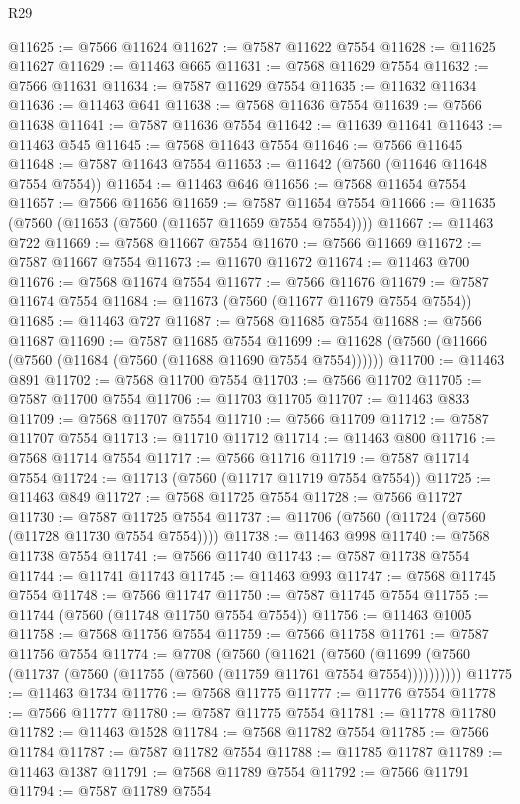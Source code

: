 \begin{lexlean}{R29}
\begin{coremodule}
@11625 := @7566 @11624
@11627 := @7587 @11622 @7554
@11628 := @11625 @11627
@11629 := @11463 @665
@11631 := @7568 @11629 @7554
@11632 := @7566 @11631
@11634 := @7587 @11629 @7554
@11635 := @11632 @11634
@11636 := @11463 @641
@11638 := @7568 @11636 @7554
@11639 := @7566 @11638
@11641 := @7587 @11636 @7554
@11642 := @11639 @11641
@11643 := @11463 @545
@11645 := @7568 @11643 @7554
@11646 := @7566 @11645
@11648 := @7587 @11643 @7554
@11653 := @11642 (@7560 (@11646 @11648 @7554 @7554))
@11654 := @11463 @646
@11656 := @7568 @11654 @7554
@11657 := @7566 @11656
@11659 := @7587 @11654 @7554
@11666 := @11635 (@7560 (@11653 (@7560 (@11657 @11659 @7554 @7554))))
@11667 := @11463 @722
@11669 := @7568 @11667 @7554
@11670 := @7566 @11669
@11672 := @7587 @11667 @7554
@11673 := @11670 @11672
@11674 := @11463 @700
@11676 := @7568 @11674 @7554
@11677 := @7566 @11676
@11679 := @7587 @11674 @7554
@11684 := @11673 (@7560 (@11677 @11679 @7554 @7554))
@11685 := @11463 @727
@11687 := @7568 @11685 @7554
@11688 := @7566 @11687
@11690 := @7587 @11685 @7554
@11699 := @11628 (@7560 (@11666 (@7560 (@11684 (@7560 (@11688 @11690 @7554 @7554))))))
@11700 := @11463 @891
@11702 := @7568 @11700 @7554
@11703 := @7566 @11702
@11705 := @7587 @11700 @7554
@11706 := @11703 @11705
@11707 := @11463 @833
@11709 := @7568 @11707 @7554
@11710 := @7566 @11709
@11712 := @7587 @11707 @7554
@11713 := @11710 @11712
@11714 := @11463 @800
@11716 := @7568 @11714 @7554
@11717 := @7566 @11716
@11719 := @7587 @11714 @7554
@11724 := @11713 (@7560 (@11717 @11719 @7554 @7554))
@11725 := @11463 @849
@11727 := @7568 @11725 @7554
@11728 := @7566 @11727
@11730 := @7587 @11725 @7554
@11737 := @11706 (@7560 (@11724 (@7560 (@11728 @11730 @7554 @7554))))
@11738 := @11463 @998
@11740 := @7568 @11738 @7554
@11741 := @7566 @11740
@11743 := @7587 @11738 @7554
@11744 := @11741 @11743
@11745 := @11463 @993
@11747 := @7568 @11745 @7554
@11748 := @7566 @11747
@11750 := @7587 @11745 @7554
@11755 := @11744 (@7560 (@11748 @11750 @7554 @7554))
@11756 := @11463 @1005
@11758 := @7568 @11756 @7554
@11759 := @7566 @11758
@11761 := @7587 @11756 @7554
@11774 := @7708
    (@7560
      (@11621
        (@7560 (@11699 (@7560 (@11737 (@7560 (@11755 (@7560 (@11759 @11761 @7554 @7554))))))))))
@11775 := @11463 @1734
@11776 := @7568 @11775
@11777 := @11776 @7554
@11778 := @7566 @11777
@11780 := @7587 @11775 @7554
@11781 := @11778 @11780
@11782 := @11463 @1528
@11784 := @7568 @11782 @7554
@11785 := @7566 @11784
@11787 := @7587 @11782 @7554
@11788 := @11785 @11787
@11789 := @11463 @1387
@11791 := @7568 @11789 @7554
@11792 := @7566 @11791
@11794 := @7587 @11789 @7554

\end{coremodule}
\end{lexlean}
